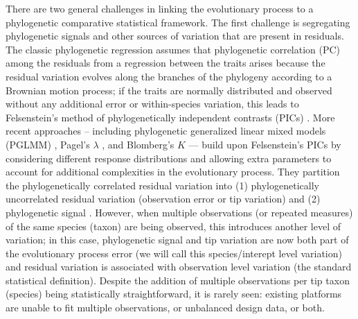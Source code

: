 There are two general challenges in linking the evolutionary process to a phylogenetic comparative statistical framework.
The first challenge is segregating phylogenetic signals \citep{blomberg2003testing} and other sources of variation that are present in residuals.  
The classic phylogenetic regression assumes that phylogenetic correlation (PC) among the residuals from a regression between the traits arises because the residual variation evolves along the branches of the phylogeny according to a Brownian motion process; if the traits are normally distributed and observed without any additional error or within-species variation, this leads to Felsenstein's method of phylogenetically independent contrasts (PICs) \citep{felsenstein1985phylogenies}.
More recent approaches -- including phylogenetic generalized linear mixed models (PGLMM) \citep{ives2011generalized}, Pagel's $\lambda$ \citep{pagel1999inferring}, and Blomberg's $K$ \citep{blomberg2003testing} --- build upon Felsenstein's PICs by considering different response distributions and allowing extra parameters to account for additional complexities in the evolutionary process. They partition the phylogenetically correlated residual variation into (1) phylogenetically uncorrelated residual variation (observation error or tip variation) and (2) phylogenetic signal  \citep[biological/evolutionary process error:][]{hansen2012interpreting}.
However, when multiple observations (or repeated measures) of the same species (taxon) are being observed, this introduces another level of variation; in this case, phylogenetic signal and tip variation are now both part of the evolutionary process error (we will call this species/interept level variation) and residual variation is associated with observation level variation (the standard statistical definition).
Despite the addition of multiple observations per tip taxon (species) being statistically straightforward, it is rarely seen: existing platforms are unable to fit multiple observations, or unbalanced design data, or both.


